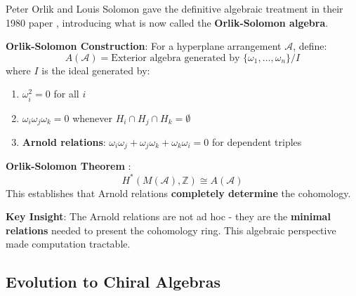 \begin{historical}
Peter Orlik and Louis Solomon gave the definitive algebraic treatment in their 1980 paper 
\cite{OrlikSolomon80}, introducing what is now called the \textbf{Orlik-Solomon algebra}.

\textbf{Orlik-Solomon Construction}:
For a hyperplane arrangement $\mathcal{A}$, define:
$$A(\mathcal{A}) = \text{Exterior algebra generated by } \{\omega_1, \ldots, \omega_n\} 
/ I$$
where $I$ is the ideal generated by:
\begin{enumerate}
\item $\omega_i^2 = 0$ for all $i$
\item $\omega_i \omega_j \omega_k = 0$ whenever $H_i \cap H_j \cap H_k = \emptyset$
\item \textbf{Arnold relations}: $\omega_i \omega_j + \omega_j \omega_k + \omega_k \omega_i = 0$ 
for dependent triples
\end{enumerate}

\textbf{Orlik-Solomon Theorem} \cite{OrlikSolomon80, Theorem 3.5}:
$$H^*(M(\mathcal{A}), \mathbb{Z}) \cong A(\mathcal{A})$$
This establishes that Arnold relations \textbf{completely determine} the cohomology.

\textbf{Key Insight}:
The Arnold relations are not ad hoc - they are the \textbf{minimal relations} needed to 
present the cohomology ring. This algebraic perspective made computation tractable.
\end{historical}

\subsection{Evolution to Chiral Algebras}


